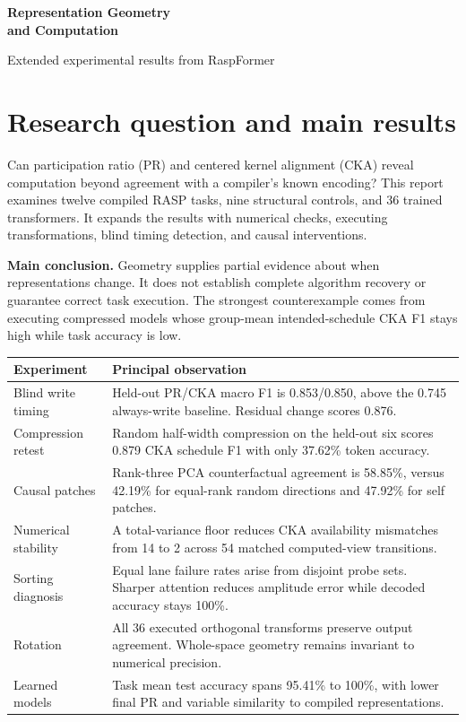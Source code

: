 \documentclass[11pt,a4paper]{article}
\begin{document}
{\sffamily\fontsize{21}{25}\selectfont\bfseries\color{navy}Representation Geometry\\and Computation}\par
{\sffamily\color{teal}Extended experimental results from RaspFormer}
\vspace{3mm}

\section{Research question and main results}
Can participation ratio (PR) and centered kernel alignment (CKA) reveal computation beyond agreement with a compiler's known encoding? This report examines twelve compiled RASP tasks, nine structural controls, and 36 trained transformers. It expands the results with numerical checks, executing transformations, blind timing detection, and causal interventions.

\textbf{Main conclusion.} Geometry supplies partial evidence about when representations change. It does not establish complete algorithm recovery or guarantee correct task execution. The strongest counterexample comes from executing compressed models whose group-mean intended-schedule CKA F1 stays high while task accuracy is low.

\begin{center}\small
\begin{tabularx}{\linewidth}{@{}P{.25\linewidth}X@{}}
\toprule
\textbf{Experiment} & \textbf{Principal observation}\\
\midrule
Blind write timing & Held-out PR/CKA macro F1 is 0.853/0.850, above the 0.745 always-write baseline. Residual change scores 0.876.\\
Compression retest & Random half-width compression on the held-out six scores 0.879 CKA schedule F1 with only 37.62\% token accuracy.\\
Causal patches & Rank-three PCA counterfactual agreement is 58.85\%, versus 42.19\% for equal-rank random directions and 47.92\% for self patches.\\
Numerical stability & A total-variance floor reduces CKA availability mismatches from 14 to 2 across 54 matched computed-view transitions.\\
Sorting diagnosis & Equal lane failure rates arise from disjoint probe sets. Sharper attention reduces amplitude error while decoded accuracy stays 100\%.\\
Rotation & All 36 executed orthogonal transforms preserve output agreement. Whole-space geometry remains invariant to numerical precision.\\
Learned models & Task mean test accuracy spans 95.41\% to 100\%, with lower final PR and variable similarity to compiled representations.\\
\bottomrule
\end{tabularx}\end{center}
\end{document}
